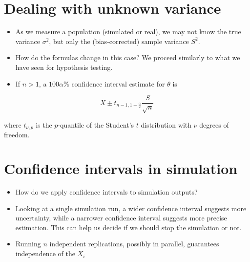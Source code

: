 \documentclass[10pt]{article}
\begin{document}
\section*{Dealing with unknown variance}
\begin{itemize}
  \item As we measure a population (simulated or real), we may not know the true variance $\sigma^{2}$, but only the (bias-corrected) sample variance $S^{2}$.
  \item How do the formulas change in this case? We proceed similarly to what we have seen for hypothesis testing.
  \item If $n>1$, a $100 \alpha \%$ confidence interval estimate for $\theta$ is
\end{itemize}

$$
\bar{X} \pm t_{n-1,1-\frac{\alpha}{2}} \frac{S}{\sqrt{n}}
$$

where $t_{\nu, p}$ is the $p$-quantile of the Student's $t$ distribution with $\nu$ degrees of freedom.

\section*{Confidence intervals in simulation}
\begin{itemize}
  \item How do we apply confidence intervals to simulation outputs?
  \item Looking at a single simulation run, a wider confidence interval suggests more uncertainty, while a narrower confidence interval suggests more precise estimation. This can help us decide if we should stop the simulation or not.
  \item Running $n$ independent replications, possibly in parallel, guarantees independence of the $X_{i}$
\end{itemize}
\end{document}
